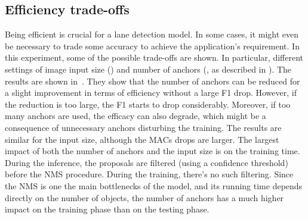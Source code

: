 \documentclass[final]{cvpr}
\begin{document}
\begin{table}[h]
    \begin{center}
         \end{center}
    \caption{State-of-the-art results on LLAMAS.}
    \label{tab:llamas}
\end{table} 
\subsection{Efficiency trade-offs}
Being efficient is crucial for a lane detection model. In some cases, it might even be necessary to trade some accuracy to achieve the application's requirement. In this experiment, some of the possible trade-offs are shown. In particular, different settings of image input size () and number of anchors (, as described in ).
The results are shown in~. They show that the number of anchors can be reduced for a slight improvement in terms of efficiency without a large F1 drop. However, if the reduction is too large, the F1 starts to drop considerably. Moreover, if too many anchors are used, the efficacy can also degrade, which might be a consequence of unnecessary anchors disturbing the training. The results are similar for the input size, although the MACs drops are larger. The largest impact of both the number of anchors and the input size is on the training time. During the inference, the proposals are filtered (using a confidence threshold) before the NMS procedure. During the training, there's no such filtering. Since the NMS is one the main bottlenecks of the model, and its running time depends directly on the number of objects, the number of anchors has a much higher impact on the training phase than on the testing phase. 
\end{document}
